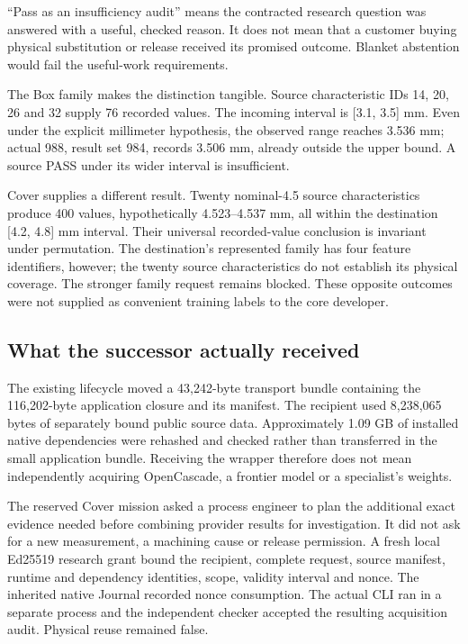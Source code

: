 \documentclass[
  11pt,
]{article}
\let\OriginalSubsection\subsection
\renewcommand{\subsection}{\needspace{6\baselineskip}\OriginalSubsection}
\begin{document}
``Pass as an insufficiency audit'' means the contracted research
question was answered with a useful, checked reason. It does not mean
that a customer buying physical substitution or release received its
promised outcome. Blanket abstention would fail the useful-work
requirements.

The Box family makes the distinction tangible. Source characteristic IDs
14, 20, 26 and 32 supply 76 recorded values. The incoming interval is
{[}3.1, 3.5{]} mm. Even under the explicit millimeter hypothesis, the
observed range reaches 3.536 mm; actual 988, result set 984, records
3.506 mm, already outside the upper bound. A source PASS under its wider
interval is insufficient.

Cover supplies a different result. Twenty nominal-4.5 source
characteristics produce 400 values, hypothetically 4.523--4.537 mm, all
within the destination {[}4.2, 4.8{]} mm interval. Their universal
recorded-value conclusion is invariant under permutation. The
destination's represented family has four feature identifiers, however;
the twenty source characteristics do not establish its physical
coverage. The stronger family request remains blocked. These opposite
outcomes were not supplied as convenient training labels to the core
developer.

\hypertarget{what-the-successor-actually-received}{%
\subsection{What the successor actually
received}\label{what-the-successor-actually-received}}

The existing lifecycle moved a 43,242-byte transport bundle containing
the 116,202-byte application closure and its manifest. The recipient
used 8,238,065 bytes of separately bound public source data.
Approximately 1.09 GB of installed native dependencies were rehashed and
checked rather than transferred in the small application bundle.
Receiving the wrapper therefore does not mean independently acquiring
OpenCascade, a frontier model or a specialist's weights.

The reserved Cover mission asked a process engineer to plan the
additional exact evidence needed before combining provider results for
investigation. It did not ask for a new measurement, a machining cause
or release permission. A fresh local Ed25519 research grant bound the
recipient, complete request, source manifest, runtime and dependency
identities, scope, validity interval and nonce. The inherited native
Journal recorded nonce consumption. The actual CLI ran in a separate
process and the independent checker accepted the resulting acquisition
audit. Physical reuse remained false.
\end{document}
